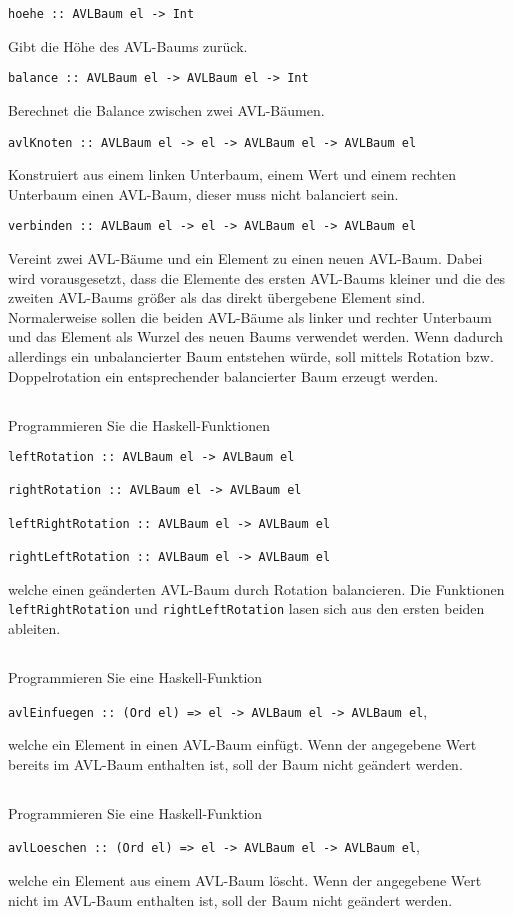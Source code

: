 \documentclass[
  10pt,                   %
  DIV12,
  german,                 %
  oneside,                %
  parskip=half,           %
  headings=normal,        %
  captions=tableheading,  %
]{scrartcl}
\begin{document}
\begin{center}
\lstinline!hoehe :: AVLBaum el -> Int!
\end{center}
Gibt die Höhe des AVL-Baums zurück.
\begin{center}
\lstinline!balance :: AVLBaum el -> AVLBaum el -> Int!
\end{center}
Berechnet die Balance zwischen zwei AVL-Bäumen.
\begin{center}
\lstinline!avlKnoten :: AVLBaum el -> el -> AVLBaum el -> AVLBaum el!
\end{center}
Konstruiert aus einem linken Unterbaum, einem Wert und einem rechten Unterbaum einen AVL-Baum, dieser muss nicht balanciert sein.
\begin{center}
\lstinline!verbinden :: AVLBaum el -> el -> AVLBaum el -> AVLBaum el!
\end{center}
Vereint zwei AVL-Bäume und ein Element zu einen neuen AVL-Baum. Dabei wird vorausgesetzt, dass die Elemente des ersten AVL-Baums kleiner und die des zweiten AVL-Baums größer als das direkt übergebene Element sind. Normalerweise sollen die beiden AVL-Bäume als linker und rechter Unterbaum und das Element als Wurzel des neuen Baums verwendet werden. Wenn dadurch allerdings ein unbalancierter Baum entstehen würde, soll mittels Rotation bzw. Doppelrotation ein entsprechender balancierter Baum erzeugt werden.

\subsection{}
Programmieren Sie die Haskell-Funktionen
\begin{lstlisting}
leftRotation :: AVLBaum el -> AVLBaum el

rightRotation :: AVLBaum el -> AVLBaum el

leftRightRotation :: AVLBaum el -> AVLBaum el

rightLeftRotation :: AVLBaum el -> AVLBaum el
\end{lstlisting}
welche einen geänderten AVL-Baum durch Rotation balancieren. Die Funktionen \lstinline|leftRightRotation| und \lstinline|rightLeftRotation| lasen sich aus den ersten beiden ableiten. 

\subsection{}
Programmieren Sie eine Haskell-Funktion
\begin{center}
\lstinline!avlEinfuegen :: (Ord el) => el -> AVLBaum el -> AVLBaum el!,
\end{center}
welche ein Element in einen AVL-Baum einfügt. Wenn der angegebene Wert bereits im AVL-Baum enthalten ist, soll der Baum nicht geändert werden.

\subsection{}
Programmieren Sie eine Haskell-Funktion
\begin{center}
\lstinline!avlLoeschen :: (Ord el) => el -> AVLBaum el -> AVLBaum el!,
\end{center}
welche ein Element aus einem AVL-Baum löscht. Wenn der angegebene Wert nicht im AVL-Baum enthalten ist, soll der Baum nicht geändert werden.
\end{document}
